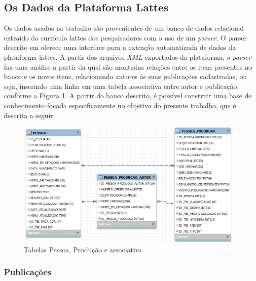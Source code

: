 \documentclass[12pt]{article}
\begin{document}
\subsection{Os Dados da Plataforma Lattes}

Os dados usados no trabalho são provenientes de um banco de dados relacional extraído do currículo lattes dos pesquisadores com o 
uso de um \textit{parser}. O parser descrito em \cite{prass2019parser} oferece uma interface para a extração automatizada de dados 
da plataforma lattes. A partir dos arquivos \textit{XML} exportados da plataforma, o \textit{parser} faz uma análise a partir da 
qual são montadas relações entre os itens presentes no banco e os novos itens, relacionando autores às suas publicações cadastradas, 
ou seja, inserindo uma linha em uma tabela associativa entre autor e publicação, conforme a Figura \ref{fig:database}. A partir do banco descrito, é 
possível construir uma base de conhecimento focada especificamente no objetivo do presente trabalho, que é descrita a seguir.

\begin{center}
  \begin{figure}[ht]
    \centering
    \includegraphics[width=.8\textwidth]{database.png}
    \caption{Tabelas Pessoa, Produção e associativa \cite{prass2019parser}}
    \label{fig:database}
  \end{figure}
 \end{center}

\subsubsection{Publicações}
\end{document}
